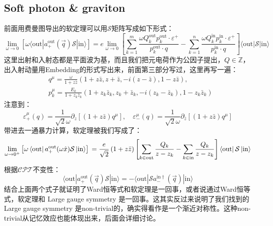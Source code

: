 \subsection{Soft photon \& graviton}
前面用费曼图导出的软定理可以用$\mathcal{S}$矩阵写成如下形式：
\begin{equation}
	\lim\limits_{\omega\to0}\left[\omega\langle\text{out}|a_+^\text{out}(\vec{q})\mathcal{S}|\text{in}\rangle\right]=e\lim\limits_{\omega\to0}\left[\sum\limits_{k=1}^m\frac{\omega Q_k^\text{out}p_k^\text{out}\cdot\varepsilon^+}{p_k^\text{out}\cdot q}-\sum\limits_{k=1}^n\frac{\omega Q_k^\text{in}p_k^\text{in}\cdot\varepsilon^+}{p_k^\text{in}\cdot q}\right]\langle\text{out}|\mathcal{S}|\text{in}\rangle 
\end{equation}
这里出射和入射态都是平面波为基，而且我们把元电荷作为公因子提出，$Q\in\mathbb{Z}$，出入射动量用Embedding的形式写出来，前面第三部分写过，这里再写一遍：
\begin{equation}
	\begin{aligned}
		&q^{\mu} =\frac\omega{1+z\bar{z}}\left(1+z\bar{z},z+\bar{z},-i(z-\bar{z}),1-z\bar{z}\right),  \\
		&p_{k}^{\mu} =\frac{E_{k}}{1+z_{k}\bar{z}_{k}}\left(1+z_{k}\bar{z}_{k},z_{k}+\bar{z}_{k},-i(z_{k}-\bar{z}_{k}),1-z_{k}\bar{z}_{k}\right) 
	\end{aligned}
\end{equation}
注意到：
\begin{equation}
	\varepsilon_{+}^{\mu}(q)=\frac{1}{\sqrt{2}\omega}\partial_{z}\left[\left(1+z\bar{z}\right)q^{\mu}\right],\quad\varepsilon_{-}^{\mu}(q)=\frac{1}{\sqrt{2}\omega}\partial_{\bar{z}}\left[\left(1+z\bar{z}\right)q^{\mu}\right]
\end{equation}
带进去一通暴力计算，软定理被我们写成了：
\begin{equation}
\lim_{\omega\to0^+}\left[\omega\left\langle\mathrm{out}\right|a_+^\mathrm{out}(\omega\hat{x})\mathcal{S}\left|\mathrm{in}\right\rangle\right]\\=\frac{e}{\sqrt{2}}\left(1+z\bar{z}\right)\left[\sum_{k\in\mathrm{out}}\frac{Q_k}{z-z_k}-\sum_{k\in\mathrm{in}}\frac{Q_k}{z-z_k}\right]\left\langle\mathrm{out}\right|\mathcal{S}\left|\mathrm{in}\right\rangle
\end{equation}
根据${\mathcal{CPT}}$不变性：
\begin{equation}
\langle\text{out}|a_+^\text{out}(\vec{q})\mathcal{S}|\text{in}\rangle=-\langle\mathrm{out}|\mathcal{S}a_{-}^{\mathrm{in}\dagger}(\vec{q})|\mathrm{in}\rangle
\end{equation}
结合上面两个式子就证明了Ward恒等式和软定理是一回事，或者说通过Ward恒等式，软定理和 Large gauge symmetry 是一回事。这其实反过来说明了我们找到的 Large gauge symmetry 是non-trivial的，确实得看作是一个渐近对称性。这种non-trivial从记忆效应也能体现出来，后面会详细讨论。

